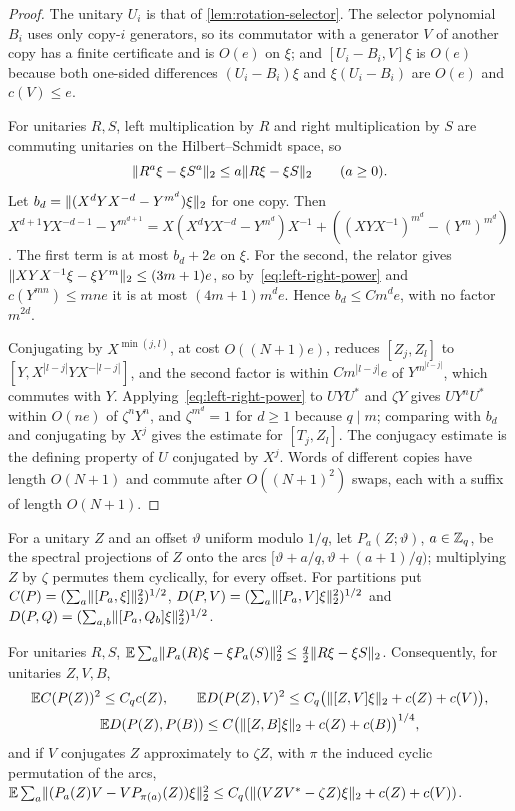 \begin{proof}
The unitary $U_i$ is that of \cref{lem:rotation-selector}. The selector polynomial $B_i$ uses only copy-$i$ generators, so its
commutator with a generator $V$ of another copy has a finite certificate and is $O(e)$ on $\xi$; and $[U_i-B_i,V]\xi$ is
$O(e)$ because both one-sided differences $(U_i-B_i)\xi$ and $\xi(U_i-B_i)$ are $O(e)$ and $c(V)\le e$.

For unitaries $R,S$, left multiplication by $R$ and right multiplication by $S$ are commuting unitaries on the
Hilbert--Schmidt space, so
\begin{equation}\label{eq:left-right-power}
\lVert R^a\xi-\xi S^a\rVert_2\le a\lVert R\xi-\xi S\rVert_2\qquad(a\ge0).
\end{equation}
Let $b_d=\lVert (X^dYX^{-d}-Y^{m^d})\xi\rVert_2$ for one copy. Then $X^{d+1}YX^{-d-1}-Y^{m^{d+1}}=X(X^dYX^{-d}-Y^{m^d})X^{-1}+
((XYX^{-1})^{m^d}-(Y^m)^{m^d})$. The first term is at most $b_d+2e$ on $\xi$. For the second, the relator gives
$\lVert XYX^{-1}\xi-\xi Y^m\rVert_2\le(3m+1)e$, so by~\eqref{eq:left-right-power} and $c(Y^{mn})\le mne$ it is at most $(4m+1)m^de$. Hence
$b_d\le Cm^de$, with no factor $m^{2d}$.

Conjugating by $X^{\min(j,l)}$, at cost $O((N+1)e)$, reduces $[Z_j,Z_l]$ to $[Y,X^{|l-j|}YX^{-|l-j|}]$, and the second factor is
within $Cm^{|l-j|}e$ of $Y^{m^{|l-j|}}$, which commutes with $Y$. Applying~\eqref{eq:left-right-power} to $UYU^*$ and $\zeta Y$ gives
$UY^nU^*$ within $O(ne)$ of $\zeta^nY^n$, and $\zeta^{m^d}=1$ for $d\ge1$ because $q\mid m$; comparing with $b_d$ and conjugating by
$X^j$ gives the estimate for $[T_j,Z_l]$. The conjugacy estimate is the defining property of $U$ conjugated by $X^j$.
Words of different copies have length $O(N+1)$ and commute after $O((N+1)^2)$ swaps, each with a suffix of length $O(N+1)$.
\end{proof}

For a unitary $Z$ and an offset $\vartheta$ uniform modulo $1/q$, let $P_a(Z;\vartheta)$, $a\in\mathbb Z_q$, be the spectral projections of
$Z$ onto the arcs $[\vartheta+a/q,\vartheta+(a+1)/q)$; multiplying $Z$ by $\zeta$ permutes them cyclically, for every offset. For
partitions put $C(P)=(\sum_a\lVert [P_a,\xi]\rVert_2^2)^{1/2}$, $D(P,V)=(\sum_a\lVert [P_a,V]\xi\rVert_2^2)^{1/2}$ and
$D(P,Q)=(\sum_{a,b}\lVert [P_a,Q_b]\xi\rVert_2^2)^{1/2}$.

\begin{lemma}\label{lem:random-cuts}
For unitaries $R,S$, $\mathbb E\sum_a\lVert P_a(R)\xi-\xi P_a(S)\rVert_2^2\le\frac q2\lVert R\xi-\xi S\rVert_2$. Consequently, for unitaries $Z,V,B$,
\begin{gather*}
\mathbb EC(P(Z))^2\le C_qc(Z),\qquad\mathbb ED(P(Z),V)^2\le C_q\bigl(\lVert [Z,V]\xi\rVert_2+c(Z)+c(V)\bigr),\\
\mathbb ED(P(Z),P(B))\le C\bigl(\lVert [Z,B]\xi\rVert_2+c(Z)+c(B)\bigr)^{1/4},
\end{gather*}
and if $V$ conjugates $Z$ approximately to $\zeta Z$, with $\pi$ the induced cyclic permutation of the arcs,
$\mathbb E\sum_a\lVert (P_a(Z)V-VP_{\pi(a)}(Z))\xi\rVert_2^2\le C_q(\lVert (VZV^*-\zeta Z)\xi\rVert_2+c(Z)+c(V))$.
\end{lemma}


